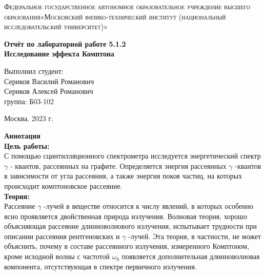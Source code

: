 \documentclass[a4paper, 12pt]{article}%
\begin{document}
	\begin{titlepage}
		\begin{center}
			\textsc{Федеральное государственное автономное образовательное учреждение высшего образования«Московский физико-технический институт (национальный исследовательский университет)»\\[5mm]
			}
			
			\vfill
			
			\textbf{Отчёт по лабораторной работе 5.1.2\\[3mm]
				Исследование эффекта Комптона
				\\[50mm]
			}
			
		\end{center}
		
		\hfill
		\begin{minipage}{.5\textwidth}
			Выполнил студент:\\[2mm]
			Сериков Василий Романович\\[2mm]
			Сериков Алексей Романович\\[2mm]
			группа: Б03-102\\[5mm]
			
		\end{minipage}
		\vfill
		\begin{center}
			Москва, 2023 г.
		\end{center}
		
	\end{titlepage}
	
	\newpage
	\setcounter{page}{2}
	\textbf{Аннотация}\\
	
	\textbf{Цель работы: }\\
	 С помощью сцинтилляционного спектрометра исследуется энергетический спектр $\gamma$ - квантов, рассеянных на графите. Определяется энергия рассеянных $\gamma$ -квантов в зависимости от угла рассеяния, а также энергия покоя частиц, на которых происходит комптоновское рассеяние.\\
	
	\textbf{Теория: }\\
	Рассеяние $\gamma$ -лучей в веществе относится к числу явлений, в которых особенно ясно проявляется двойственная природа излучения. Волновая теория, хорошо объясняющая рассеяние длинноволнового излучения, испытывает трудности при описании рассеяния рентгеновских и $\gamma$ -лучей. Эта теория, в частности, не может объяснить, почему в составе рассеянного излучения, измеренного Комптоном, кроме исходной волны с частотой $\omega_{0}$ появляется дополнительная длинноволновая компонента, отсутствующая в спектре первичного излучения.
	
\end{document}
